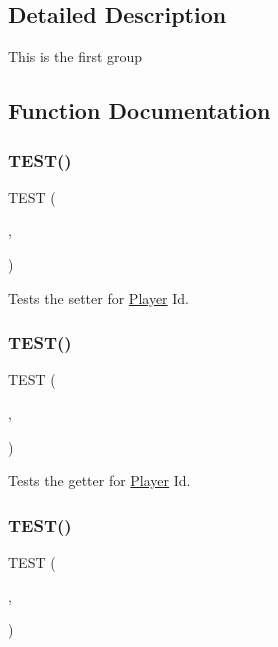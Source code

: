 \subsection{Detailed Description}
This is the first group 

\subsection{Function Documentation}
\mbox{\label{group__group1_gae741ae9791030192de7d721c93a13bd1}} 
\subsubsection{\texorpdfstring{T\+E\+S\+T()}{TEST()}\hspace{0.1cm}{\footnotesize\ttfamily [1/18]}}
{\footnotesize\ttfamily T\+E\+ST (\begin{DoxyParamCaption}\item[{player\+Test}]{,  }\item[{set\+P\+Id\+Test}]{ }\end{DoxyParamCaption})}

Tests the setter for \hyperlink{classPlayer}{Player} Id. \mbox{\label{group__group1_ga5f70dd6a5d3871941af5c7aab63ee78f}} 
\subsubsection{\texorpdfstring{T\+E\+S\+T()}{TEST()}\hspace{0.1cm}{\footnotesize\ttfamily [2/18]}}
{\footnotesize\ttfamily T\+E\+ST (\begin{DoxyParamCaption}\item[{player\+Test}]{,  }\item[{get\+P\+Id\+Test}]{ }\end{DoxyParamCaption})}

Tests the getter for \hyperlink{classPlayer}{Player} Id. \mbox{\label{group__group1_gaec2fa9415afb1e6ea1a51b87946d7d33}} 
\subsubsection{\texorpdfstring{T\+E\+S\+T()}{TEST()}\hspace{0.1cm}{\footnotesize\ttfamily [3/18]}}
{\footnotesize\ttfamily T\+E\+ST (\begin{DoxyParamCaption}\item[{player\+Test}]{,  }\item[{set\+Role\+Test}]{ }\end{DoxyParamCaption})}

